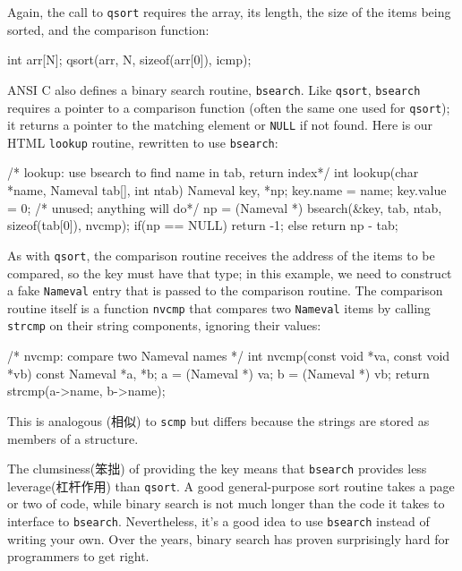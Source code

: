 Again, the call to \verb'qsort' requires the array, its length, the size of
the items being sorted, and the comparison function:
\begin{wellcode}
    int arr[N];
    qsort(arr, N, sizeof(arr[0]), icmp);
\end{wellcode}

ANSI C also defines a binary search routine, \verb'bsearch'. Like
\verb'qsort', \verb'bsearch' requires a pointer to a comparison function
(often the same one used for \verb'qsort'); it returns a pointer to the
matching element or \verb'NULL' if not found. Here is our HTML
\verb'lookup' routine, rewritten to use \verb'bsearch':
\begin{wellcode}
    /* lookup: use bsearch to find name in tab, return index*/
    int lookup(char *name, Nameval tab[], int ntab)
    {
        Nameval key, *np;
        key.name = name;
        key.value = 0;  /* unused; anything will do*/
        np = (Nameval *) bsearch(&key, tab, ntab, sizeof(tab[0]), nvcmp);
        if(np == NULL)
            return -1;
        else
            return np - tab;
    }
\end{wellcode}

As with \verb'qsort', the comparison routine receives the address of the
items to be compared, so the key must have that type; in this example, we
need to construct a fake \verb'Nameval' entry that is passed to the
comparison routine. The comparison routine itself is a function
\verb'nvcmp' that compares two \verb'Nameval' items by calling
\verb'strcmp' on their string components, ignoring their values:
\begin{wellcode}
    /* nvcmp: compare two Nameval names */
    int nvcmp(const void *va, const void *vb)
    {
        const Nameval *a, *b;
        a = (Nameval *) va;
        b = (Nameval *) vb;
        return strcmp(a->name, b->name);
    }
\end{wellcode}
This is analogous (相似) to \verb'scmp' but differs because the strings are
stored as members of a structure.

The clumsiness(笨拙) of providing the key means that \verb'bsearch'
provides less leverage(杠杆作用) than \verb'qsort'. A good general-purpose
sort routine takes a page or two of code, while binary search is not much
longer than the code it takes to interface to \verb'bsearch'. Nevertheless,
it's a good idea to use \verb'bsearch' instead of writing your own. Over
the years, binary search has proven surprisingly hard for programmers to
get right.

